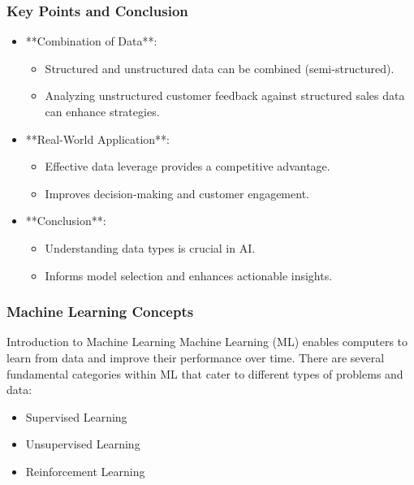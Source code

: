 \documentclass[aspectratio=169]{beamer}
\begin{document}
\begin{frame}[fragile]
    \frametitle{Key Points and Conclusion}
    \begin{itemize}
        \item **Combination of Data**:
        \begin{itemize}
            \item Structured and unstructured data can be combined (semi-structured).
            \item Analyzing unstructured customer feedback against structured sales data can enhance strategies.
        \end{itemize}
        
        \item **Real-World Application**:
        \begin{itemize}
            \item Effective data leverage provides a competitive advantage.
            \item Improves decision-making and customer engagement.
        \end{itemize}
        
        \item **Conclusion**:
        \begin{itemize}
            \item Understanding data types is crucial in AI.
            \item Informs model selection and enhances actionable insights.
        \end{itemize}
    \end{itemize}
\end{frame}

\begin{frame}[fragile]
    \frametitle{Machine Learning Concepts}
    
    \begin{block}{Introduction to Machine Learning}
        Machine Learning (ML) enables computers to learn from data and improve their performance over time. There are several fundamental categories within ML that cater to different types of problems and data:
    \end{block}

    \begin{itemize}
        \item Supervised Learning
        \item Unsupervised Learning
        \item Reinforcement Learning
    \end{itemize}
\end{frame}
\end{document}
